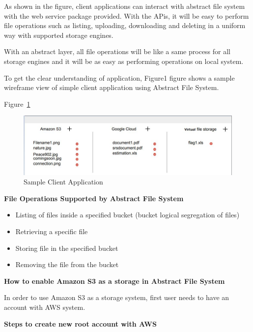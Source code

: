 As shown in the figure, client applications can interact with abstract file 
system with the web service package provided. With the APis, it will be easy 
to perform file operations such as listing, uploading, downloading and 
deleting in a uniform way with supported storage engines. 

With an abstract layer, all file operations will be like a same process for 
all storage engines and it will be as easy as performing operations on local 
system. 


To get the clear understanding of application, Figure1 figure shows a sample 
wireframe view of simple client application using Abstract File System. 

Figure~\ref{fig:client}

\begin{figure}[!ht]
        \centering\includegraphics[width=\columnwidth]
        {image/client.JPG}
        \caption{Sample Client Application}\label{fig:client}
\end{figure}



\textbf{File Operations Supported by Abstract File System}


\begin{itemize}
    \item   Listing of files inside a specified bucket (bucket logical
segregation of files)
    \item       Retrieving a specific file
    \item       Storing file in  the specified bucket
    \item       Removing the file from the bucket
\end{itemize}



\textbf{How to enable Amazon S3 as a storage in Abstract File System}


In order to use Amazon S3 as a storage system, first user needs to have an
account with AWS system.


\textbf{Steps to create new root account with AWS}

